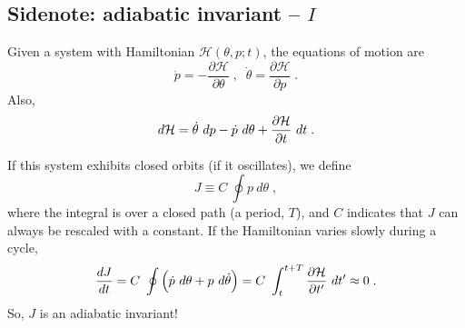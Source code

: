 \documentclass[10pt,utf8,compress,xcolor=dvipsnames]{beamer}
\begin{document}
\subsection{Sidenote: adiabatic invariant -- $I$}
\begin{frame}{\insertsubsectionhead}
	Given a system with Hamiltonian $\mathcal{H}(\theta,p;t)$, the equations of motion are 
	\begin{equation*}
	\dot p = - \dfrac{\partial \mathcal{H}}{\partial \theta} \;, \;\; 
	\dot \theta =  \dfrac{\partial \mathcal{H}}{\partial p} \;.
	\end{equation*}
	Also,
	\begin{equation*}
	d \Ham = \dot \theta \ d p - \dot p \ d \theta + \dfrac{\partial \Ham}{\partial t} \ d t \;.  
	\end{equation*}
	
	
	If this system exhibits closed orbits (\eg if it oscillates), we define 
	\begin{equation*}
	J \equiv C \ \oint p \ d \theta \;,
	\end{equation*}
	where the integral is over a closed path (\eg a period, $T$), and $C$ indicates that $J$ can always be rescaled with a constant. If the Hamiltonian varies slowly during a cycle,
	\[
	\dfrac{d J}{d t} = C \ \oint \lrBigb{\dot p \ d \theta + p \ d \dot \theta} = C \ \dint_{t}^{t+T}  \dfrac{\partial \Ham}{\partial t^\prime} \ d t^\prime  \approx 0 
	\;. 
	\]
	So, $J$ is an adiabatic invariant!
\end{frame}
\end{document}
